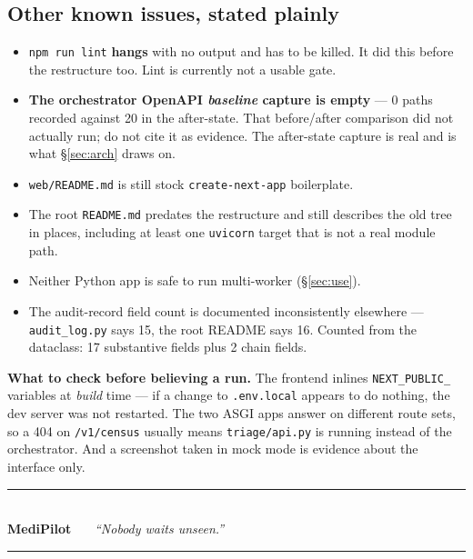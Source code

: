 \documentclass[10pt,a4paper,twocolumn]{article}
\newcommand{\pth}[1]{\textcolor{SecPurple}{\texttt{#1}}}
\newcommand{\cm}[1]{\texttt{#1}}
\begin{document}
\subsection{Other known issues, stated plainly}
\begin{itemize}
  \item \cm{npm run lint} \textbf{hangs} with no output and has to be killed. It did this before
        the restructure too. Lint is currently not a usable gate.
  \item \textbf{The orchestrator OpenAPI \emph{baseline} capture is empty} --- 0 paths recorded
        against 20 in the after-state. That before/after comparison did not actually run; do not
        cite it as evidence. The after-state capture is real and is what
        \S\ref{sec:arch} draws on.
  \item \pth{web/README.md} is still stock \cm{create-next-app} boilerplate.
  \item The root \pth{README.md} predates the restructure and still describes the old tree in
        places, including at least one \cm{uvicorn} target that is not a real module path.
  \item Neither Python app is safe to run multi-worker (\S\ref{sec:use}).
  \item The audit-record field count is documented inconsistently elsewhere --- \pth{audit\_log.py}
        says 15, the root README says 16. Counted from the dataclass: 17 substantive fields plus 2
        chain fields.
\end{itemize}

\begin{tcolorbox}[mpbox]
\textbf{What to check before believing a run.} The frontend inlines \cm{NEXT\_PUBLIC\_} variables
at \emph{build} time --- if a change to \pth{.env.local} appears to do nothing, the dev server was
not restarted. The two ASGI apps answer on different route sets, so a 404 on \cm{/v1/census}
usually means \pth{triage/api.py} is running instead of the orchestrator. And a screenshot taken in
mock mode is evidence about the interface only.
\end{tcolorbox}

\vspace{6pt}
\noindent\parbox{\linewidth}{%
  \textcolor{AccPurple}{\rule{\linewidth}{1pt}}\\[3pt]
  \centering\sffamily\footnotesize
  \textcolor{AccPurple}{\bfseries Medi}{\bfseries Pilot} \ \textbullet\ \
  \textit{``Nobody waits unseen.''}\\[3pt]
  \textcolor{Border}{\rule{\linewidth}{0.5pt}}}
\end{document}
